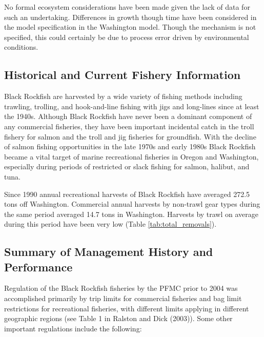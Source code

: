 \documentclass[11pt,
  english,
  letterpaper,
]{article}
\begin{document}
No formal ecosystem considerations have been made given the lack of data for such an undertaking. Differences in growth though time have been considered in the model specification in the Washington model. Though the mechanism is not specified, this could certainly be due to process error driven by environmental conditions.

\hypertarget{historical-and-current-fishery-information}{%
\subsection{Historical and Current Fishery Information}\label{historical-and-current-fishery-information}}

Black Rockfish are harvested by a wide variety of fishing methods including trawling, trolling, and hook-and-line fishing with jigs and long-lines since at least the 1940s. Although Black Rockfish have never been a dominant component of any commercial fisheries, they have been important incidental catch in the troll fishery for salmon and the troll and jig fisheries for groundfish. With the decline of salmon fishing opportunities in the late 1970s and early 1980s Black Rockfish became a vital target of marine recreational fisheries in Oregon and Washington, especially during periods of restricted or slack fishing for salmon, halibut, and tuna.

Since 1990 annual recreational harvests of Black Rockfish have averaged 272.5 tons off Washington. Commercial annual harvests by non-trawl gear types during the same period averaged 14.7 tons in Washington. Harvests by trawl on average during this period have been very low (Table \ref{tab:total_removals}).

\hypertarget{summary-of-management-history-and-performance}{%
\subsection{Summary of Management History and Performance}\label{summary-of-management-history-and-performance}}

Regulation of the Black Rockfish fisheries by the PFMC prior to 2004 was accomplished primarily by trip limits for commercial fisheries and bag limit restrictions for recreational fisheries, with different limits applying in different geographic regions (see Table 1 in Ralston and Dick (2003)). Some other important regulations include the following:
\end{document}

